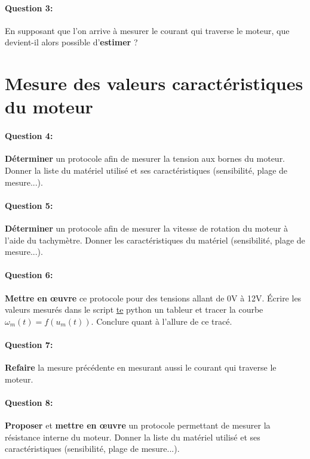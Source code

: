 \paragraph{Question 3:} En supposant que l'on arrive à mesurer le courant qui traverse le moteur, que devient-il alors possible d'\textbf{estimer} ?

\newpage

\section{Mesure des valeurs caractéristiques du moteur} 

\paragraph{Question 4:} \textbf{Déterminer} un protocole afin de mesurer la tension aux bornes du moteur. Donner la liste du matériel utilisé et ses caractéristiques (sensibilité, plage de mesure...).

\paragraph{Question 5:} \textbf{Déterminer} un protocole afin de mesurer la vitesse de rotation du moteur à l'aide du tachymètre. Donner les caractéristiques du matériel (sensibilité, plage de mesure...).

\paragraph{Question 6:} \textbf{Mettre en \oe uvre} ce protocole pour des tensions allant de 0V à 12V. Écrire les valeurs mesurés dans le script 
\href{https://github.com/Costadoat/Sciences-Ingenieur/raw/master/S01\%20Analyse\%20fonctionnelle/TP01\%20Modélisation\%20linéaire/Ilot_01\%20Moteur\%20\%C3\%A0\%20courant\%20continu/01-TP01-I01.py}{te} python
un tableur et tracer la courbe $\omega_m(t)=f(u_m(t))$. Conclure quant à l'allure de ce tracé.

\paragraph{Question 7:} \textbf{Refaire} la mesure précédente en mesurant aussi le courant qui traverse le moteur.

\paragraph{Question 8:} \textbf{Proposer} et \textbf{mettre en \oe uvre} un protocole permettant de mesurer la résistance interne du moteur. Donner la liste du matériel utilisé et ses caractéristiques (sensibilité, plage de mesure...).

